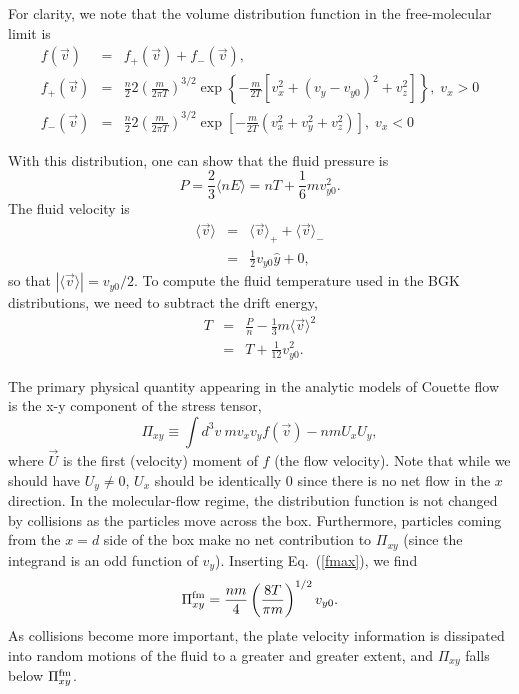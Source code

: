 \documentclass[12pt]{report}
\begin{document}
For clarity, we note that the volume distribution function in the
free-molecular limit is
\begin{eqnarray}
f(\vec{v}) & = & f_{+}(\vec{v}) + f_{-}(\vec{v}), \\
\label{fmax}
f_{+}(\vec{v}) & = & \frac{n}{2} 2 \left( \frac{m}{2 \pi T} \right)^{3/2}
\exp \left \{ - \frac{m}{2T} [v_{x}^{2} + (v_{y} - v_{y0})^{2} + v_{z}^{2}]
\right \}, \; v_{x} > 0 \\
f_{-}(\vec{v}) & = & \frac{n}{2} 2 \left( \frac{m}{2 \pi T} \right)^{3/2}
\exp \left [ - \frac{m}{2T} (v_{x}^{2} + v_{y}^{2} + v_{z}^{2})
\right ], \; v_{x} < 0 
\end{eqnarray}

With this distribution, one can show that the fluid pressure is
\begin{equation}
P = \frac{2}{3} \langle n E \rangle = nT + \frac{1}{6}mv_{y0}^{2}.
\end{equation}
The fluid velocity is
\begin{eqnarray}
\langle \vec{v} \rangle & = & \langle \vec{v} \rangle_{+} 
+ \langle \vec{v} \rangle_{-} \nonumber \\
& = & \frac{1}{2} v_{y0} \hat{y} + 0,
\end{eqnarray} 
so that $| \langle \vec{v} \rangle | = v_{y0} / 2$.
To compute the fluid temperature used in the BGK distributions, we need
to subtract the drift energy,
\begin{eqnarray} 
T & = & \frac{P}{n} - \frac{1}{3} m \langle \vec{v} \rangle^{2}  \\
\label{tdrift}
  & = & T + \frac{1}{12} v_{y0}^{2}.
\label{tcouette}
\end{eqnarray}

The primary physical quantity appearing in the analytic 
models\cite{Will62,Cerc69,Cerc75} of Couette
flow is the x-y component of the stress tensor,
\begin{equation}
\Pi_{xy} \equiv \int d^{3} v \: m v_{x} v_{y} f(\vec{v})
- n m U_{x} U_{y},
\end{equation}
where $\vec{U}$ is the first (velocity) moment of $f$ (the flow 
velocity). Note that while we should have $U_{y} \neq 0$, $U_{x}$ should
be identically 0 since there is no net flow in the $x$ direction.
In the molecular-flow regime, the distribution function is not changed by
collisions as the particles move across the box. Furthermore, particles
coming from the $x = d$ side of the box make no net contribution to
$\Pi_{xy}$ (since the integrand is an odd function of $v_{y}$). 
Inserting Eq.~(\ref{fmax}), we find
\begin{equation}
\Pi_{xy}^{\rm fm} = \frac{n m}{4} \left( \frac{8 T}{\pi m} \right)^{1/2} v_{y0}.
\label{fmstress}
\end{equation}
As collisions become more important, 
the plate velocity information is
dissipated into random motions of the fluid to a greater and greater
extent, and $\Pi_{xy}$ falls below $\Pi_{xy}^{\rm fm}$.
\end{document}
